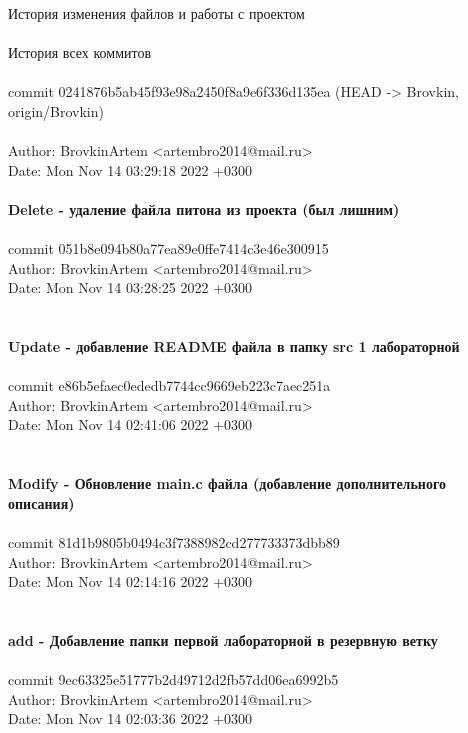 \documentclass{article}
\begin{document}
\newpage

\huge{История изменения файлов и работы с проектом}
\\ \\ \Large{История всех коммитов}
\\ \\ \large{commit 0241876b5ab45f93e98a2450f8a9e6f336d135ea (HEAD -> Brovkin, origin/Brovkin) \\ \\
Author: BrovkinArtem <artembro2014@mail.ru> \\
Date:   Mon Nov 14 03:29:18 2022 +0300
\\ \\
    \textbf{Delete - удаление файла питона из проекта (был лишним)}
\\ \\
commit 051b8e094b80a77ea89e0ffe7414c3e46e300915 \\
Author: BrovkinArtem <artembro2014@mail.ru> \\
Date:   Mon Nov 14 03:28:25 2022 +0300 \\
\\ \\
    \textbf{Update - добавление README файла в папку src 1 лабораторной}
\\ \\
commit e86b5efaec0ededb7744cc9669eb223c7aec251a \\
Author: BrovkinArtem <artembro2014@mail.ru> \\ 
Date:   Mon Nov 14 02:41:06 2022 +0300 \\
\\ \\
    \textbf{Modify - Обновление main.c файла (добавление дополнительного описания)}
\\ \\
commit 81d1b9805b0494c3f7388982cd277733373dbb89 \\
Author: BrovkinArtem <artembro2014@mail.ru> \\
Date:   Mon Nov 14 02:14:16 2022 +0300 \\
\\ \\
    \textbf{add - Добавление папки первой лабораторной в резервную ветку}
\\ \\
commit 9ec63325e51777b2d49712d2fb57dd06ea6992b5 \\
Author: BrovkinArtem <artembro2014@mail.ru> \\
Date:   Mon Nov 14 02:03:36 2022 +0300 \\
}
\end{document}
